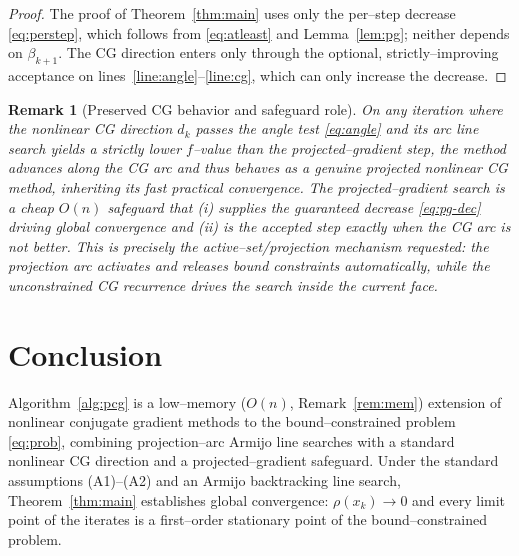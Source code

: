 \documentclass[12pt]{article}
\newtheorem{remark}{Remark}
\begin{document}
\begin{proof}
The proof of Theorem~\ref{thm:main} uses only the per--step decrease
\eqref{eq:perstep}, which follows from \eqref{eq:atleast} and
Lemma~\ref{lem:pg}; neither depends on $\beta_{k+1}$. The CG direction enters
only through the optional, strictly--improving acceptance on
lines~\ref{line:angle}--\ref{line:cg}, which can only increase the decrease.
\end{proof}

\begin{remark}[Preserved CG behavior and safeguard role]
On any iteration where the nonlinear CG direction $d_k$ passes the angle test
\eqref{eq:angle} and its arc line search yields a strictly lower $f$--value than
the projected--gradient step, the method advances along the CG arc and thus
behaves as a genuine projected nonlinear CG method, inheriting its fast
practical convergence. The projected--gradient search is a cheap $O(n)$
safeguard that (i) supplies the guaranteed decrease \eqref{eq:pg-dec} driving
global convergence and (ii) is the accepted step exactly when the CG arc is not
better. This is precisely the active--set/projection mechanism requested: the
projection arc activates and releases bound constraints automatically, while
the unconstrained CG recurrence drives the search inside the current face.
\end{remark}

\section{Conclusion}

Algorithm~\ref{alg:pcg} is a low--memory ($O(n)$, Remark~\ref{rem:mem})
extension of nonlinear conjugate gradient methods to the bound--constrained
problem \eqref{eq:prob}, combining projection--arc Armijo line searches with a
standard nonlinear CG direction and a projected--gradient safeguard. Under the
standard assumptions (A1)--(A2) and an Armijo backtracking line search,
Theorem~\ref{thm:main} establishes global convergence: $\rho(x_k)\to0$ and every
limit point of the iterates is a first--order stationary point of the
bound--constrained problem.
\end{document}
